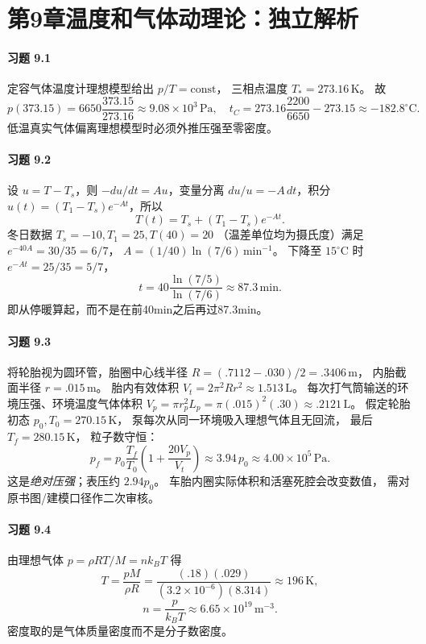 \section*{第9章\quad 温度和气体动理论：独立解析}
\paragraph{习题 9.1}
定容气体温度计理想模型给出 \(p/T=\mathrm{const}\)，
三相点温度 \(T_*=273.16\,\mathrm K\)。
故
\[
 \boxed{p(373.15)=6650\frac{373.15}{273.16}
 \approx9.08\times10^3\,\mathrm{Pa}},
\quad
 \boxed{t_C=273.16\frac{2200}{6650}-273.15
 \approx-182.8^\circ\mathrm C}.
\]
低温真实气体偏离理想模型时必须外推压强至零密度。

\paragraph{习题 9.2}
设 \(u=T-T_s\)，则
\(-du/dt=Au\)，变量分离
\(du/u=-A\,dt\)，积分
\(u(t)=(T_1-T_s)e^{-At}\)，所以
\[
 \boxed{T(t)=T_s+(T_1-T_s)e^{-At}}.
\]
冬日数据 \(T_s=-10,T_1=25,T(40)=20\)
（温差单位均为摄氏度）满足
\(e^{-40A}=30/35=6/7\)，
\(A=(1/40)\ln(7/6)\,\mathrm{min^{-1}}\)。
下降至 \(15^\circ\mathrm C\) 时
\(e^{-At}=25/35=5/7\)，
\[
 \boxed{t=40\frac{\ln(7/5)}{\ln(7/6)}
 \approx87.3\,\mathrm{min}}.
\]
即从停暖算起，而不是在前40min之后再过87.3min。

\paragraph{习题 9.3}
将轮胎视为圆环管，胎圈中心线半径
\(R=(.7112-.030)/2=.3406\,\mathrm m\)，
内胎截面半径 \(r=.015\,\mathrm m\)。
胎内有效体积
\(V_t=2\pi^2Rr^2\approx1.513\,\mathrm L\)。
每次打气筒输送的环境压强、环境温度气体体积
\(V_p=\pi r_p^2 L_p
 =\pi(.015)^2(.30)\approx.2121\,\mathrm L\)。
假定轮胎初态 \(p_0,T_0=270.15\,\mathrm K\)，
泵每次从同一环境吸入理想气体且无回流，
最后 \(T_f=280.15\,\mathrm K\)，
粒子数守恒：
\[
 \boxed{p_f=p_0\frac{T_f}{T_0}
 \left(1+\frac{20V_p}{V_t}\right)
 \approx3.94\,p_0
 \approx4.00\times10^5\,\mathrm{Pa}}.
\]
这是\emph{绝对压强}；表压约 \(2.94p_0\)。
车胎内圈实际体积和活塞死腔会改变数值，
需对原书图/建模口径作二次审核。

\paragraph{习题 9.4}
由理想气体
\(p=\rho RT/M=nk_BT\) 得
\[
 \boxed{T=\frac{pM}{\rho R}
 =\frac{(.18)(.029)}
 {(3.2\times10^{-6})(8.314)}
 \approx196\,\mathrm K},
\]
\[
 \boxed{n=\frac p{k_BT}
 \approx6.65\times10^{19}\,\mathrm{m^{-3}}}.
\]
密度取的是气体质量密度而不是分子数密度。

